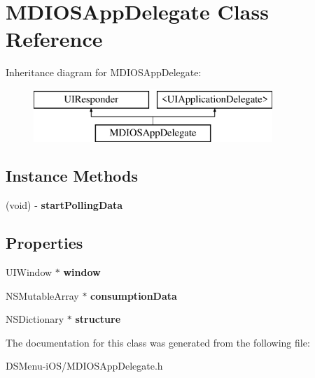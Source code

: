 \hypertarget{interface_m_d_i_o_s_app_delegate}{\section{M\-D\-I\-O\-S\-App\-Delegate Class Reference}
\label{interface_m_d_i_o_s_app_delegate}
}
Inheritance diagram for M\-D\-I\-O\-S\-App\-Delegate\-:\begin{figure}[H]
\begin{center}
\leavevmode
\includegraphics[height=2.000000cm]{interface_m_d_i_o_s_app_delegate}
\end{center}
\end{figure}
\subsection*{Instance Methods}
\begin{DoxyCompactItemize}
\item 
\hypertarget{interface_m_d_i_o_s_app_delegate_a6034bb57a2c69551b2b71da162d39a88}{(void) -\/ {\bfseries start\-Polling\-Data}}\label{interface_m_d_i_o_s_app_delegate_a6034bb57a2c69551b2b71da162d39a88}

\end{DoxyCompactItemize}
\subsection*{Properties}
\begin{DoxyCompactItemize}
\item 
\hypertarget{interface_m_d_i_o_s_app_delegate_a303bc9919d7c8707d6b40ea8f6d02df4}{U\-I\-Window $\ast$ {\bfseries window}}\label{interface_m_d_i_o_s_app_delegate_a303bc9919d7c8707d6b40ea8f6d02df4}

\item 
\hypertarget{interface_m_d_i_o_s_app_delegate_adb5ed4465f433d222f154981599a0c72}{N\-S\-Mutable\-Array $\ast$ {\bfseries consumption\-Data}}\label{interface_m_d_i_o_s_app_delegate_adb5ed4465f433d222f154981599a0c72}

\item 
\hypertarget{interface_m_d_i_o_s_app_delegate_a487757aa2c39735b306d116126e3eb64}{N\-S\-Dictionary $\ast$ {\bfseries structure}}\label{interface_m_d_i_o_s_app_delegate_a487757aa2c39735b306d116126e3eb64}

\end{DoxyCompactItemize}


The documentation for this class was generated from the following file\-:\begin{DoxyCompactItemize}
\item 
D\-S\-Menu-\/i\-O\-S/M\-D\-I\-O\-S\-App\-Delegate.\-h\end{DoxyCompactItemize}

